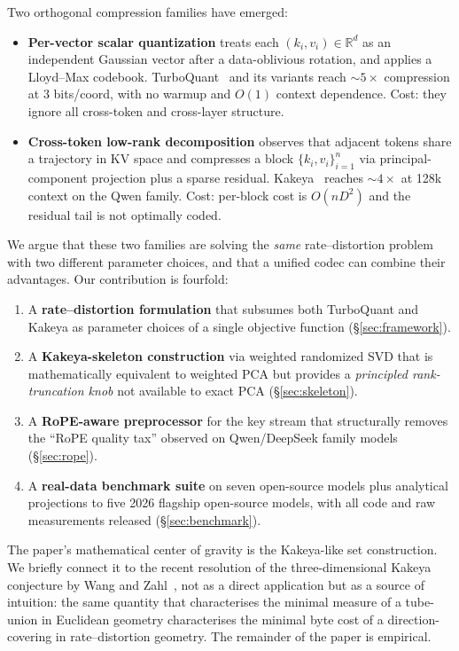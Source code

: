 \documentclass[11pt,a4paper]{article}
\theoremstyle{definition}
\theoremstyle{plain}
\newcommand{\R}{\mathbb{R}}
\begin{document}
Two orthogonal compression families have emerged:
\begin{itemize}[leftmargin=*]
  \item \textbf{Per-vector scalar quantization} treats each $(k_i, v_i) \in \R^d$ as an independent Gaussian vector after a data-oblivious rotation, and applies a Lloyd--Max codebook. TurboQuant~\cite{turboquant} and its variants reach $\sim 5\times$ compression at $3$ bits/coord, with no warmup and $O(1)$ context dependence. Cost: they ignore all cross-token and cross-layer structure.
  \item \textbf{Cross-token low-rank decomposition} observes that adjacent tokens share a trajectory in KV space and compresses a block $\{k_i, v_i\}_{i=1}^n$ via principal-component projection plus a sparse residual. Kakeya~\cite{kakeya-kv} reaches $\sim 4\times$ at 128k context on the Qwen family. Cost: per-block cost is $O(nD^2)$ and the residual tail is not optimally coded.
\end{itemize}

We argue that these two families are solving the \emph{same} rate--distortion problem with two different parameter choices, and that a unified codec can combine their advantages. Our contribution is fourfold:
\begin{enumerate}[leftmargin=*]
  \item A \textbf{rate--distortion formulation} that subsumes both TurboQuant and Kakeya as parameter choices of a single objective function (\S\ref{sec:framework}).
  \item A \textbf{Kakeya-skeleton construction} via weighted randomized SVD that is mathematically equivalent to weighted PCA but provides a \emph{principled rank-truncation knob} not available to exact PCA (\S\ref{sec:skeleton}).
  \item A \textbf{RoPE-aware preprocessor} for the key stream that structurally removes the ``RoPE quality tax'' observed on Qwen/DeepSeek family models (\S\ref{sec:rope}).
  \item A \textbf{real-data benchmark suite} on seven open-source models plus analytical projections to five 2026 flagship open-source models, with all code and raw measurements released (\S\ref{sec:benchmark}).
\end{enumerate}

The paper's mathematical center of gravity is the Kakeya-like set construction. We briefly connect it to the recent resolution of the three-dimensional Kakeya conjecture by Wang and Zahl~\cite{wang-zahl}, not as a direct application but as a source of intuition: the same quantity that characterises the minimal measure of a tube-union in Euclidean geometry characterises the minimal byte cost of a direction-covering in rate--distortion geometry. The remainder of the paper is empirical.
\end{document}
